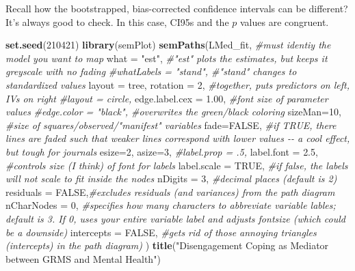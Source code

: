 \documentclass[
  11pt,
]{book}
\newenvironment{Shaded}{\begin{snugshade}}{\end{snugshade}}
\newcommand{\AttributeTok}[1]{\textcolor[rgb]{0.27,0.27,0.27}{#1}}
\newcommand{\CommentTok}[1]{\textcolor[rgb]{0.37,0.37,0.37}{\textit{#1}}}
\newcommand{\ConstantTok}[1]{\textcolor[rgb]{0.37,0.37,0.37}{#1}}
\newcommand{\DecValTok}[1]{\textcolor[rgb]{0.06,0.06,0.06}{#1}}
\newcommand{\FloatTok}[1]{\textcolor[rgb]{0.06,0.06,0.06}{#1}}
\newcommand{\FunctionTok}[1]{\textcolor[rgb]{0.27,0.27,0.27}{\textbf{#1}}}
\newcommand{\NormalTok}[1]{#1}
\newcommand{\StringTok}[1]{\textcolor[rgb]{0.5,0.5,0.5}{#1}}
\begin{document}
Recall how the bootstrapped, bias-corrected confidence intervals can be different? It's always good to check. In this case, CI95s and the \(p\) values are congruent.

\begin{Shaded}
\begin{Highlighting}[]
\FunctionTok{set.seed}\NormalTok{(}\DecValTok{210421}\NormalTok{)}
\FunctionTok{library}\NormalTok{(semPlot)}
\FunctionTok{semPaths}\NormalTok{(LMed\_fit, }\CommentTok{\#must identiy the model you want to map}
         \AttributeTok{what =} \StringTok{"est"}\NormalTok{, }\CommentTok{\#"est" plots the estimates, but keeps it greyscale with no fading}
         \CommentTok{\#whatLabels = "stand", \#"stand" changes to standardized values}
         \AttributeTok{layout =} \StringTok{\textquotesingle{}tree\textquotesingle{}}\NormalTok{, }\AttributeTok{rotation =} \DecValTok{2}\NormalTok{, }\CommentTok{\#together, puts predictors on left, IVs on right }
         \CommentTok{\#layout = \textquotesingle{}circle\textquotesingle{},}
         \AttributeTok{edge.label.cex =} \FloatTok{1.00}\NormalTok{, }\CommentTok{\#font size of parameter values}
         \CommentTok{\#edge.color = "black", \#overwrites the green/black coloring}
         \AttributeTok{sizeMan=}\DecValTok{10}\NormalTok{, }\CommentTok{\#size of squares/observed/"manifest" variables}
         \AttributeTok{fade=}\ConstantTok{FALSE}\NormalTok{, }\CommentTok{\#if TRUE, there lines are faded such that weaker lines correspond with lower values {-}{-} a cool effect, but tough for journals}
         \AttributeTok{esize=}\DecValTok{2}\NormalTok{, }
         \AttributeTok{asize=}\DecValTok{3}\NormalTok{,}
         \CommentTok{\#label.prop = .5,}
         \AttributeTok{label.font =} \FloatTok{2.5}\NormalTok{, }\CommentTok{\#controls size (I think) of font for labels}
         \AttributeTok{label.scale =} \ConstantTok{TRUE}\NormalTok{, }\CommentTok{\#if false, the labels will not scale to fit inside the nodes}
         \AttributeTok{nDigits =} \DecValTok{3}\NormalTok{, }\CommentTok{\#decimal places (default is 2)}
         \AttributeTok{residuals =} \ConstantTok{FALSE}\NormalTok{,}\CommentTok{\#excludes residuals (and variances) from the path diagram}
         \AttributeTok{nCharNodes =} \DecValTok{0}\NormalTok{, }\CommentTok{\#specifies how many characters to abbreviate variable lables; default is 3.  If 0, uses your entire variable label and adjusts fontsize (which could be a downside)}
         \AttributeTok{intercepts =} \ConstantTok{FALSE}\NormalTok{, }\CommentTok{\#gets rid of those annoying triangles (intercepts) in the path diagram)}
\NormalTok{)}
\FunctionTok{title}\NormalTok{(}\StringTok{"Disengagement Coping as Mediator between GRMS and Mental Health"}\NormalTok{)}
\end{Highlighting}
\end{Shaded}
\end{document}
